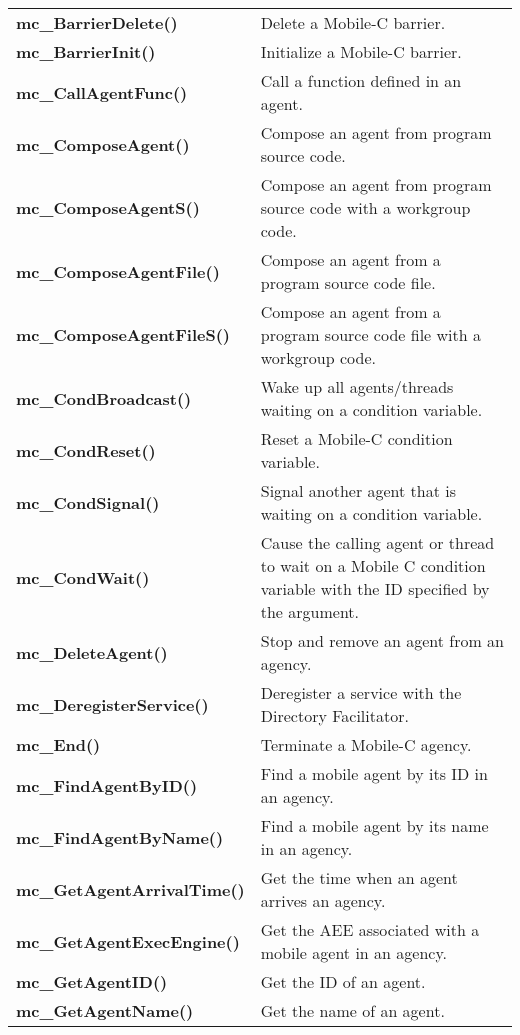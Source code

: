 \begin{table}[!h]
\begin{center}
\begin{tabular}{p{63 mm}p{97 mm}}
{\bf mc\_BarrierDelete()} \dotfill  &  Delete a Mobile-C barrier. \\
{\bf mc\_BarrierInit()} \dotfill  &  Initialize a Mobile-C barrier. \\
{\bf mc\_CallAgentFunc()} \dotfill  &  Call a function defined in an agent. \\
{\bf mc\_ComposeAgent()} \dotfill  &  Compose an agent from program source code. \\
{\bf mc\_ComposeAgentS()} \dotfill  &  Compose an agent from program source code with a workgroup code. \\
{\bf mc\_ComposeAgentFile()} \dotfill  &  Compose an agent from a program source code file. \\
{\bf mc\_ComposeAgentFileS()} \dotfill  &  Compose an agent from a program source code file with a workgroup code. \\
{\bf mc\_CondBroadcast()} \dotfill  &  Wake up all agents/threads waiting on a condition variable. \\
{\bf mc\_CondReset()} \dotfill  &  Reset a Mobile-C condition variable. \\
{\bf mc\_CondSignal()} \dotfill  &  Signal another agent that is waiting on a condition variable. \\
{\bf mc\_CondWait()} \dotfill  &  Cause the calling agent or thread to wait on a Mobile C condition variable with the ID specified by the argument. \\
{\bf mc\_DeleteAgent()} \dotfill  &  Stop and remove an agent from an agency. \\
{\bf mc\_DeregisterService()} \dotfill  &  Deregister a service with the Directory Facilitator. \\
{\bf mc\_End()} \dotfill  &  Terminate a Mobile-C agency. \\
{\bf mc\_FindAgentByID()} \dotfill  &  Find a mobile agent by its ID in an agency. \\
{\bf mc\_FindAgentByName()} \dotfill  &  Find a mobile agent by its name in an agency. \\
{\bf mc\_GetAgentArrivalTime()} \dotfill  &  Get the time when an agent arrives an agency. \\
{\bf mc\_GetAgentExecEngine()} \dotfill  &  Get the AEE associated with a mobile agent in an agency. \\
{\bf mc\_GetAgentID()} \dotfill  &  Get the ID of an agent. \\
{\bf mc\_GetAgentName()} \dotfill  &  Get the name of an agent. \\
\hline
\end{tabular}
\end{center}
\label{chmobilec_api_cscript}
\end{table}
\pagebreak

